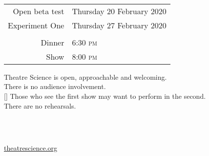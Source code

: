 \documentclass{article}
\begin{document}
  \thispagestyle{empty}

  \begin{center}

    \vspace*{2in}


    \vspace{1in}

    \\
    \vspace{0.5cm}
    \\
    \vspace{0.5cm}
    \\

    \vspace{1in}

    {\Huge


      \vspace{0.5in}

      \begin{tabular}{rl}

        Open beta test       & Thursday 20 February 2020 \\
        Experiment One  & Thursday 27 February 2020 \\
        & \\
        Dinner & 6:30 \textsc{pm} \\
        Show   & 8:00 \textsc{pm}

      \end{tabular}


      \vspace{1in}

      Theatre Science is open, approachable and welcoming.  \\
      There is no audience involvement.\\
      [\baselineskip]
      Those who see the first show may want to perform in the second.\\
      There are no rehearsals.

    }

    \vspace{1.5in}

    \\
    \vspace{0.2cm}
    \\

    \vspace{1in}

    {\Huge \url{theatrescience.org} \\ \ccby }

\end{center}
\end{document}
